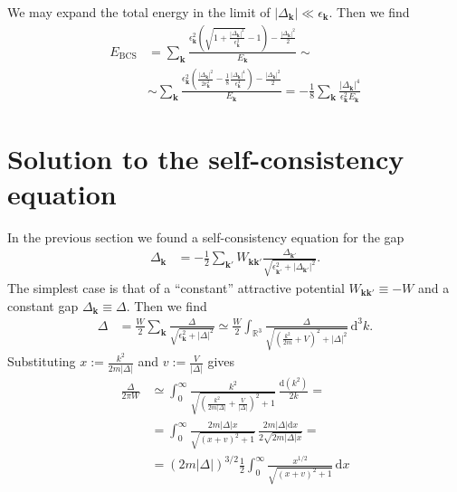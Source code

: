 \documentclass[english, parskip=full]{scrartcl}
\newcommand{\intx}{}
\newcommand{\intr}{}
\newcommand{\kla}{}
\newcommand{\tecxt}{}
\begin{document}
We may expand the total energy in the limit of $|\Delta_\textbf{k}| \ll \epsilon_\textbf{k}$.
Then we find
\begin{align}
E_\tecxt\text{BCS} &= \sum_\textbf{k} \frac{\epsilon_\textbf{k}^2 \kla\left( \sqrt{1 + \frac{|\Delta_\textbf{k}|^2}{\epsilon_\textbf{k}^2}} - 1 \right) - \frac{|\Delta_\textbf{k}|^2}{2}}{E_\textbf{k}} \sim \\
&\sim \sum_\textbf{k}  \frac{\epsilon_\textbf{k}^2 \kla\left( \frac{|\Delta_\textbf{k}|^2}{2\epsilon_\textbf{k}^2} - \frac{1}{8} \frac{|\Delta_\textbf{k}|^4}{\epsilon_\textbf{k}^4} \right) - \frac{|\Delta_\textbf{k}|^2}{2}}{E_\textbf{k}} = -\frac{1}{8} \sum_\textbf{k} \frac{|\Delta_\textbf{k}|^4}{\epsilon_\textbf{k}^2 E_\textbf{k}}
\end{align}

\section{Solution to the self-consistency equation}
In the previous section we found a self-consistency equation for the gap
\begin{align}
\Delta_{\mathbf{k}} &= -\frac{1}{2}\sum_{\mathbf{k}'} W_{\mathbf{k}\textbf{k}'} \frac{\Delta_{\mathbf{k}'}}{\sqrt{\epsilon_{\mathbf{k}'}^2 + |\Delta_{\mathbf{k}'}|^2}}.
\end{align}   
The simplest case is that of a ``constant'' attractive potential $W_{\textbf{k}\textbf{k}'} \equiv -W$ and a constant gap $\Delta_\textbf{k} \equiv \Delta$.
Then we find
\begin{align}
\Delta &= \frac{W}{2} \sum_{\textbf{k}} \frac{\Delta}{\sqrt{\epsilon_\textbf{k}^2 + |\Delta|^2}} \simeq \frac{W}{2} \intr\int_{\mathbb{R}^{3}} \frac{\Delta}{\sqrt{\kla\left( \frac{k^2}{2m} + V \right)^2 + |\Delta|^2}} \, \mathrm{d}^{3}k.
\end{align}
Substituting $x := \frac{k^2}{2m|\Delta|}$ and $v := \frac{V}{|\Delta|}$ gives
\begin{align}
\frac{\Delta}{2\pi W} &\simeq \intx\int_{0}^{\infty} \frac{k^2}{\sqrt{\kla\left( \frac{k^2}{2m|\Delta|} + \frac{V}{|\Delta|} \right)^2 + 1}}\, \frac{\mathrm{d}(k^2)}{2k} = \\
&= \intx\int_{0}^{\infty} \frac{2m|\Delta|x}{\sqrt{\kla\left( x + v \right)^2 + 1}}\, \frac{2m|\Delta| \text{d}x}{2\sqrt{2m|\Delta|x}} = \\
&= \kla\left( 2m|\Delta| \right)^{3/2} \frac{1}{2} \intx\int_{0}^{\infty} \frac{x^{1/2}}{\sqrt{\left( x + v \right)^2 + 1}} \, \mathrm{d}x
\end{align}


\end{document}
